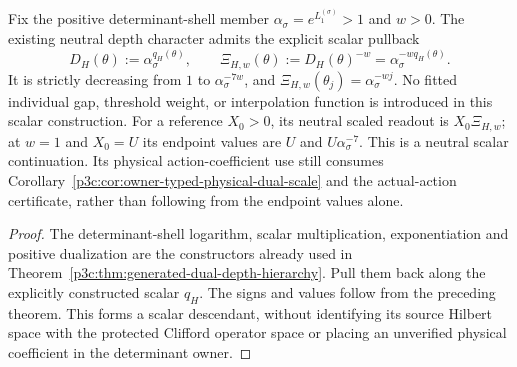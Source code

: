 \documentclass[12pt,a4paper]{article}
\begin{document}
\begin{corollary}
\label{p3c:cor:v2218-born-depth-neutral-character}
Fix the positive determinant-shell member
\(\alpha_\sigma=e^{L_1^{(\sigma)}}>1\) and \(w>0\).
The existing neutral depth character admits the explicit scalar pullback
\begin{equation}
 D_H(\theta):=\alpha_\sigma^{q_H(\theta)},\qquad
 \boxed{\Xi_{H,w}(\theta):=D_H(\theta)^{-w}
                         =\alpha_\sigma^{-wq_H(\theta)}.}
 \label{p3c:eq:v2218-born-depth-neutral-character}
\end{equation}
It is strictly decreasing from \(1\) to
\(\alpha_\sigma^{-7w}\), and
\(\Xi_{H,w}(\theta_j)=\alpha_\sigma^{-wj}\).
No fitted individual gap, threshold weight, or interpolation function
is introduced in this scalar construction. For a reference \(X_0>0\),
its neutral scaled readout is \(X_0\Xi_{H,w}\); at \(w=1\) and
\(X_0=U\) its endpoint values are \(U\) and \(U\alpha_\sigma^{-7}\).
This is a neutral scalar continuation. Its physical action-coefficient
use still consumes Corollary~\ref{p3c:cor:owner-typed-physical-dual-scale}
and the actual-action certificate, rather than following from the
endpoint values alone.
\end{corollary}
\begin{proof}
The determinant-shell logarithm, scalar multiplication, exponentiation
and positive dualization are the constructors already used in
Theorem~\ref{p3c:thm:generated-dual-depth-hierarchy}. Pull them back
along the explicitly constructed scalar \(q_H\). The signs and values
follow from the preceding theorem. This forms a scalar descendant,
without identifying its source Hilbert space with the protected
Clifford operator space or placing an unverified physical coefficient
in the determinant owner.
\end{proof}
\end{document}
